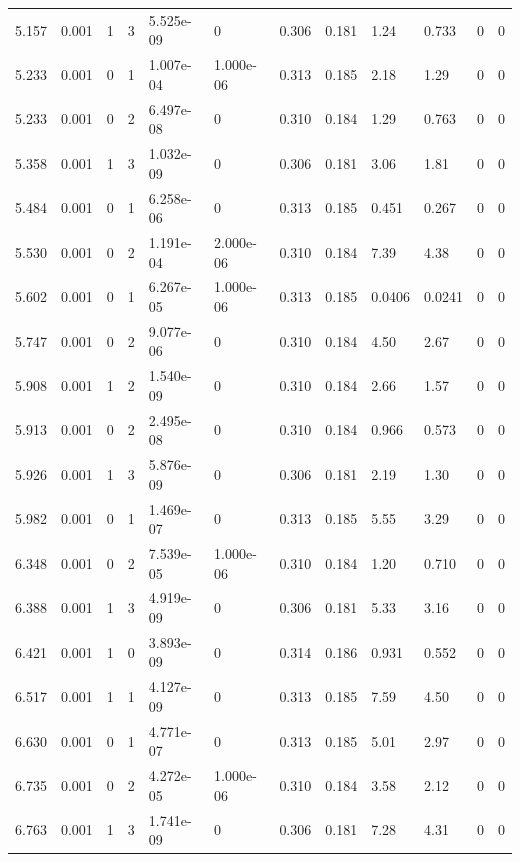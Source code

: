\documentclass[preview]{standalone}
\begin{document}
{{{\begin{tabular}{L{1.2cm}C{1.2cm} C{0.3cm}C{0.5cm} C{1.4cm}C{1.4cm} C{1.4cm}C{1.4cm} C{1.6cm}C{1.6cm} C{1.6cm}C{1.6cm}}
  5.157  &  0.001  & 1     &  3 &  5.525e-09  & 0  &  0.306&   0.181& 1.24 & 0.733   &  0 & 0  \\ 
  5.233  &  0.001  & 0     &  1 &  1.007e-04  & 1.000e-06  &  0.313&   0.185& 2.18 & 1.29   &  0 & 0  \\ 
  5.233  &  0.001  & 0     &  2 &  6.497e-08  & 0  &  0.310&   0.184& 1.29 & 0.763   &  0 & 0  \\ 
  5.358  &  0.001  & 1     &  3 &  1.032e-09  & 0  &  0.306&   0.181& 3.06 & 1.81   &  0 & 0  \\ 
  5.484  &  0.001  & 0     &  1 &  6.258e-06  & 0  &  0.313&   0.185& 0.451 & 0.267   &  0 & 0  \\ 
  5.530  &  0.001  & 0     &  2 &  1.191e-04  & 2.000e-06  &  0.310&   0.184& 7.39 & 4.38   &  0 & 0  \\ 
  5.602  &  0.001  & 0     &  1 &  6.267e-05  & 1.000e-06  &  0.313&   0.185& 0.0406 & 0.0241   &  0 & 0  \\ 
  5.747  &  0.001  & 0     &  2 &  9.077e-06  & 0  &  0.310&   0.184& 4.50 & 2.67   &  0 & 0  \\ 
  5.908  &  0.001  & 1     &  2 &  1.540e-09  & 0  &  0.310&   0.184& 2.66 & 1.57   &  0 & 0  \\ 
  5.913  &  0.001  & 0     &  2 &  2.495e-08  & 0  &  0.310&   0.184& 0.966 & 0.573   &  0 & 0  \\ 
  5.926  &  0.001  & 1     &  3 &  5.876e-09  & 0  &  0.306&   0.181& 2.19 & 1.30   &  0 & 0  \\ 
  5.982  &  0.001  & 0     &  1 &  1.469e-07  & 0  &  0.313&   0.185& 5.55 & 3.29   &  0 & 0  \\ 
  6.348  &  0.001  & 0     &  2 &  7.539e-05  & 1.000e-06  &  0.310&   0.184& 1.20 & 0.710   &  0 & 0  \\ 
  6.388  &  0.001  & 1     &  3 &  4.919e-09  & 0  &  0.306&   0.181& 5.33 & 3.16   &  0 & 0  \\ 
  6.421  &  0.001  & 1     &  0 &  3.893e-09  & 0  &  0.314&   0.186& 0.931 & 0.552   &  0 & 0  \\ 
  6.517  &  0.001  & 1     &  1 &  4.127e-09  & 0  &  0.313&   0.185& 7.59 & 4.50   &  0 & 0  \\ 
  6.630  &  0.001  & 0     &  1 &  4.771e-07  & 0  &  0.313&   0.185& 5.01 & 2.97   &  0 & 0  \\ 
  6.735  &  0.001  & 0     &  2 &  4.272e-05  & 1.000e-06  &  0.310&   0.184& 3.58 & 2.12   &  0 & 0  \\ 
  6.763  &  0.001  & 1     &  3 &  1.741e-09  & 0  &  0.306&   0.181& 7.28 & 4.31   &  0 & 0  \\ 

\end{tabular}}}}
\end{document}
